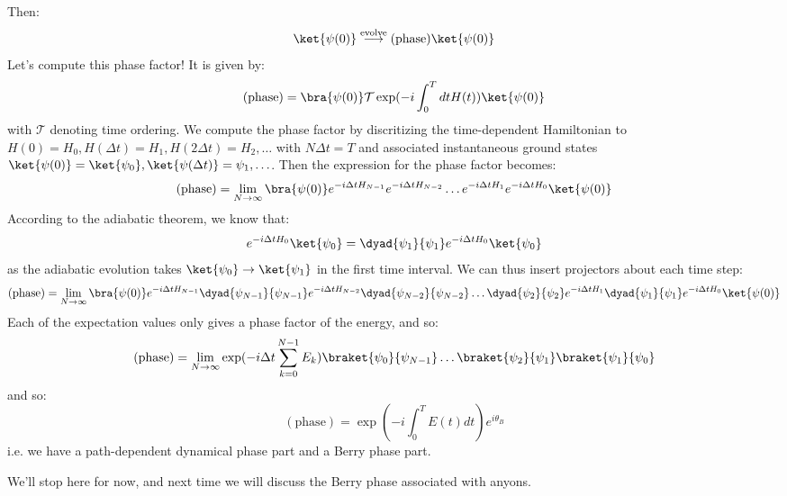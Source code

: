 Then:
\begin{equation}
    \ket{\psi(0)} \stackrel{\text{evolve}}{\longrightarrow} (\text{phase})\ket{\psi(0)}
\end{equation}
Let's compute this phase factor! It is given by:
\begin{equation}
    (\text{phase}) = \bra{\psi(0)}\mathcal{T}\exp(-i\int_0^T dt H(t))\ket{\psi(0)}
\end{equation}
with $\mathcal{T}$ denoting time ordering. We compute the phase factor by discritizing the time-dependent Hamiltonian to $H(0) = H_0, H(\Delta t) = H_1, H(2\Delta t) = H_2, \ldots$ with $N\Delta t = T$ and associated instantaneous ground states $\ket{\psi(0)} = \ket{\psi_0}, \ket{\psi(\Delta t)} = \psi_1, \ldots$. Then the expression for the phase factor becomes:
\begin{equation}
    (\text{phase}) = \lim_{N \to \infty }\bra{\psi(0)}e^{-i\Delta tH_{N-1}}e^{-i\Delta tH_{N-2}}\ldots e^{-i\Delta tH_{1}}e^{-i\Delta tH_{0}}\ket{\psi(0)}
\end{equation}
According to the adiabatic theorem, we know that:
\begin{equation}
    e^{-i\Delta t H_0}\ket{\psi_0} = \dyad{\psi_1}{\psi_1}e^{-i\Delta t H_0}\ket{\psi_0}
\end{equation}
as the adiabatic evolution takes $\ket{\psi_0} \to \ket{\psi_1}$ in the first time interval. We can thus insert projectors about each time step:
\begin{equation}
    (\text{phase}) = \lim_{N \to \infty }\bra{\psi(0)}e^{-i\Delta tH_{N-1}}\dyad{\psi_{N-1}}{\psi_{N-1}}e^{-i\Delta tH_{N-2}}\dyad{\psi_{N-2}}{\psi_{N-2}}\ldots \dyad{\psi_{2}}{\psi_{2}}e^{-i\Delta tH_{1}}\dyad{\psi_{1}}{\psi_{1}}e^{-i\Delta tH_{0}}\ket{\psi(0)}
\end{equation}
Each of the expectation values only gives a phase factor of the energy, and so:
\begin{equation}
    (\text{phase}) =  \lim_{N \to \infty }\exp(-i\Delta t \sum_{k=0}^{N-1}E_k)\braket{\psi_0}{\psi_{N-1}}\ldots\braket{\psi_2}{\psi_1}\braket{\psi_1}{\psi_0}
\end{equation}
and so:
\begin{equation}
    \boxed{(\text{phase}) = \exp(-i\int_0^T E(t)dt)e^{i\theta_B}}
\end{equation}
i.e. we have a path-dependent dynamical phase part and a Berry phase part.

We'll stop here for now, and next time we will discuss the Berry phase associated with anyons.